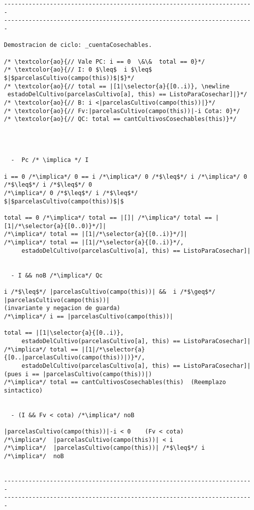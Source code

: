 \begin{lstlisting}
-----------------------------------------------------------------------
-----------------------------------------------------------------------

Demostracion de ciclo: _cuentaCosechables.

/* \textcolor{ao}{// Vale PC: i == 0  \&\&  total == 0}*/
/* \textcolor{ao}{// I: 0 $\leq$  i $\leq$ $|$parcelasCultivo(campo(this))$|$}*/
/* \textcolor{ao}{// total == |[1|\selector{a}{[0..i)}, \newline
 estadoDelCultivo(parcelasCultivo[a], this) == ListoParaCosechar]|}*/
/* \textcolor{ao}{// B: i <|parcelasCultivo(campo(this))|}*/
/* \textcolor{ao}{// Fv:|parcelasCultivo(campo(this))|-i Cota: 0}*/
/* \textcolor{ao}{// QC: total == cantCultivosCosechables(this)}*/    




  -  Pc /* \implica */ I
  
i == 0 /*\implica*/ 0 == i /*\implica*/ 0 /*$\leq$*/ i /*\implica*/ 0 /*$\leq$*/ i /*$\leq$*/ 0 
/*\implica*/ 0 /*$\leq$*/ i /*$\leq$*/ $|$parcelasCultivo(campo(this))$|$

total == 0 /*\implica*/ total == |[]| /*\implica*/ total == |[1|/*\selector{a}{[0..0)}*/]|
/*\implica*/ total == |[1|/*\selector{a}{[0..i)}*/]| 
/*\implica*/ total == |[1|/*\selector{a}{[0..i)}*/, 
     estadoDelCultivo(parcelasCultivo[a], this) == ListoParaCosechar]|


  - I && noB /*\implica*/ Qc
  
i /*$\leq$*/ |parcelasCultivo(campo(this))| &&  i /*$\geq$*/ |parcelasCultivo(campo(this))| 
(invariante y negacion de guarda)
/*\implica*/ i == |parcelasCultivo(campo(this))|

total == |[1|\selector{a}{[0..i)}, 
     estadoDelCultivo(parcelasCultivo[a], this) == ListoParaCosechar]|
/*\implica*/ total == |[1|/*\selector{a}{[0..|parcelasCultivo(campo(this))|)}*/,
     estadoDelCultivo(parcelasCultivo[a], this) == ListoParaCosechar]|
(pues i == |parcelasCultivo(campo(this))|)
/*\implica*/ total == cantCultivosCosechables(this)  (Reemplazo sintactico)


  - (I && Fv < cota) /*\implica*/ noB

|parcelasCultivo(campo(this))|-i < 0    (Fv < cota)
/*\implica*/  |parcelasCultivo(campo(this))| < i    
/*\implica*/  |parcelasCultivo(campo(this))| /*$\leq$*/ i
/*\implica*/  noB


-----------------------------------------------------------------------
-----------------------------------------------------------------------


\end{lstlisting}
